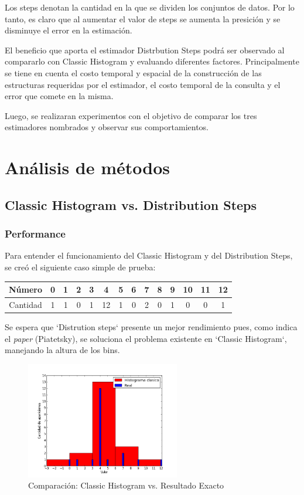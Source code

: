 \documentclass[10pt, a4paper,english,spanish,hidelinks]{article}
\begin{document}
Los steps denotan la cantidad en la que se dividen los conjuntos de datos. Por lo tanto,
es claro que al aumentar el valor de steps se aumenta la presición y se disminuye el
error en la estimación.

El beneficio que aporta el estimador Distrbution Steps podrá ser observado al compararlo
con Classic Histogram y evaluando diferentes factores. Principalmente se tiene en cuenta
el costo temporal y espacial de la construcción de las estructuras requeridas por el
estimador, el costo temporal de la consulta y el error que comete en la misma.

Luego, se realizaran experimentos con el objetivo de comparar los tres estimadores nombrados y observar sus comportamientos.

\newpage
\section{Análisis de métodos}
\subsection{Classic Histogram vs. Distribution Steps}
\subsubsection{Performance}
Para entender el funcionamiento del Classic Histogram y del Distribution Steps, se creó el siguiente caso simple de prueba:

\begin{table}[htdp]
  \begin{center}
    \begin{tabular}{|c|c|c|c|c|c|c|c|c|c|c|c|c|c|} \hline
       Número  & 0 & 1 & 2 & 3 & 4 & 5 & 6 & 7 & 8 & 9 & 10 & 11 & 12 \\ \hline
       Cantidad & 1 & 1 & 0 & 1 & 12 & 1 & 0 & 2 & 0 & 1 & 0 & 0 & 1 \\ \hline
    \end{tabular}
  \end{center}
\end{table}


Se espera que `Distrution steps` presente un mejor rendimiento pues, como indica el \textit{paper} (Piatetsky),
se soluciona el problema existente en `Classic Histogram`, manejando la altura
de los bins.

\begin{figure}[h!]
  \centering
  \includegraphics[width=0.6\textwidth]{./imagenes/ejb1_ejemplo_classic_y_real.png}
  \caption{Comparación: Classic Histogram vs. Resultado Exacto}
\end{figure}
\end{document}
